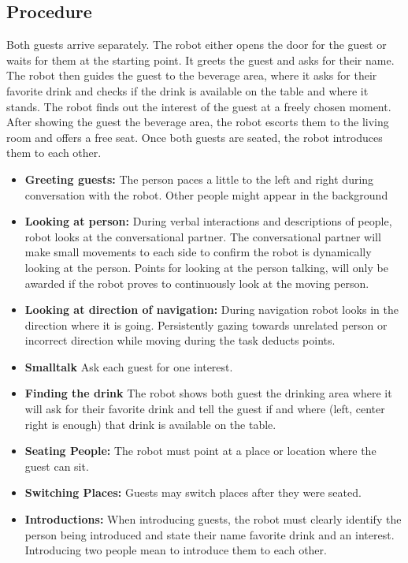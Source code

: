 \subsection*{Procedure}
Both guests arrive separately. The robot either opens the door for the guest or waits for them at the starting point. It greets the guest and asks for their name. The robot then guides the guest to the beverage area, where it asks for their favorite drink and checks if the drink is available on the table and where it stands. The robot finds out the interest of the guest at a freely chosen moment. After showing the guest the beverage area, the robot escorts them to the living room and offers a free seat. Once both guests are seated, the robot introduces them to each other.
\begin{itemize}
	\item \textbf{Greeting guests:} The person paces a little to the left and right during conversation with the robot. Other people might appear in the background
	
	\item \textbf{Looking at person:} During verbal interactions and descriptions of people, robot 
	looks at the conversational partner. The conversational partner will make small movements to each side to confirm the robot is dynamically looking at the person. Points for looking at the person talking, will only be awarded if the robot proves to continuously look at the moving person. 
	
	\item \textbf{Looking at direction of navigation:} During navigation robot looks in the direction where it is going. Persistently gazing towards unrelated person or incorrect direction while moving during the task deducts points. 
    
    \item \textbf{Smalltalk} Ask each guest for one interest.
    
    \item \textbf{Finding the drink} The robot shows both guest the drinking area where it will ask for their favorite drink and tell the guest if and where (left, center right is enough) that drink is available on the table. 
	
	\item \textbf{Seating People:} The robot must point at a place or location where the guest can sit.
	
	\item \textbf{Switching Places:} Guests may switch places after they were seated.
	
	\item \textbf{Introductions:} When introducing guests, the robot must clearly identify the person being introduced and state their name favorite drink and an interest. Introducing two people mean to introduce them to each other.
\end{itemize}


